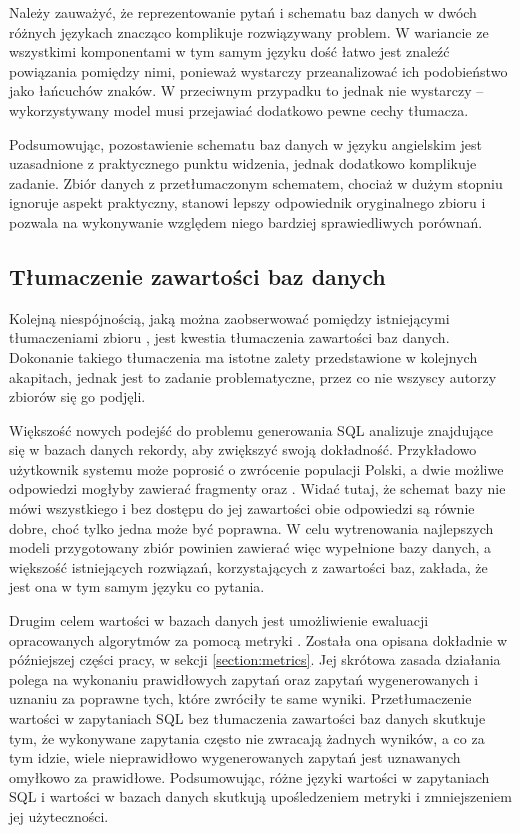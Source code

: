 Należy zauważyć, że reprezentowanie pytań i schematu baz danych w dwóch różnych językach znacząco komplikuje rozwiązywany problem. W wariancie ze wszystkimi komponentami w tym samym języku dość łatwo jest znaleźć powiązania pomiędzy nimi, ponieważ wystarczy przeanalizować ich podobieństwo jako łańcuchów znaków. W przeciwnym przypadku to jednak nie wystarczy -- wykorzystywany model musi przejawiać dodatkowo pewne cechy tłumacza.

Podsumowując, pozostawienie schematu baz danych w języku angielskim jest uzasadnione z praktycznego punktu widzenia, jednak dodatkowo komplikuje zadanie. Zbiór danych z przetłumaczonym schematem, chociaż w dużym stopniu ignoruje aspekt praktyczny, stanowi lepszy odpowiednik oryginalnego zbioru  i pozwala na wykonywanie względem niego bardziej sprawiedliwych porównań.

\subsection{Tłumaczenie zawartości baz danych}
Kolejną niespójnością, jaką można zaobserwować pomiędzy istniejącymi tłumaczeniami zbioru , jest kwestia tłumaczenia zawartości baz danych. Dokonanie takiego tłumaczenia ma istotne zalety przedstawione w kolejnych akapitach, jednak jest to zadanie problematyczne, przez co nie wszyscy autorzy zbiorów się go podjęli.

Większość nowych podejść do problemu generowania SQL analizuje znajdujące się w bazach danych rekordy, aby zwiększyć swoją dokładność. Przykładowo użytkownik systemu może poprosić o zwrócenie populacji Polski, a dwie możliwe odpowiedzi mogłyby zawierać fragmenty  oraz . Widać tutaj, że schemat bazy nie mówi wszystkiego i bez dostępu do jej zawartości obie odpowiedzi są równie dobre, choć tylko jedna może być poprawna. W celu wytrenowania najlepszych modeli przygotowany zbiór powinien zawierać więc wypełnione bazy danych, a większość istniejących rozwiązań, korzystających z zawartości baz, zakłada, że jest ona w tym samym języku co pytania.

Drugim celem wartości w bazach danych jest umożliwienie ewaluacji opracowanych algorytmów  za pomocą metryki . Została ona opisana dokładnie w późniejszej części pracy, w sekcji \ref{section:metrics}. Jej skrótowa zasada działania polega na wykonaniu prawidłowych zapytań oraz zapytań wygenerowanych i uznaniu za poprawne tych, które zwróciły te same wyniki. Przetłumaczenie wartości w zapytaniach SQL bez tłumaczenia zawartości baz danych skutkuje tym, że wykonywane zapytania często nie zwracają żadnych wyników, a co za tym idzie, wiele nieprawidłowo wygenerowanych zapytań jest uznawanych omyłkowo za prawidłowe. Podsumowując, różne języki wartości w zapytaniach SQL i wartości w bazach danych skutkują upośledzeniem metryki  i zmniejszeniem jej użyteczności.


